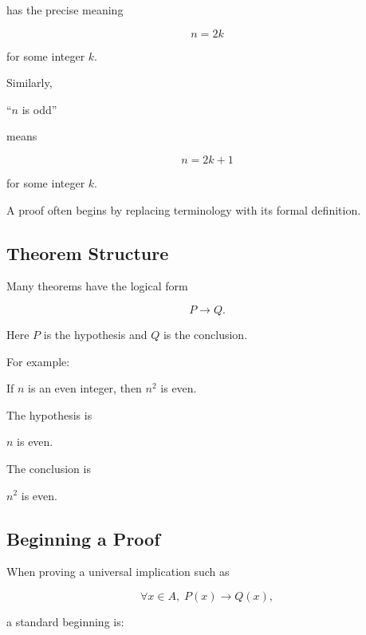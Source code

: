has the precise meaning

\[ n=2k \]

for some integer \(k\).

Similarly,

\begin{center}
``\(n\) is odd''
\end{center}

means

\[ n=2k+1 \]

for some integer \(k\).

A proof often begins by replacing terminology with its formal definition.

\subsection{Theorem Structure}
\label{subsec:theorem-structure}

Many theorems have the logical form

\[ P\to Q. \]

Here \(P\) is the hypothesis and \(Q\) is the conclusion.

For example:

\begin{theorem}
If \(n\) is an even integer, then \(n^2\) is even.
\end{theorem}

The hypothesis is

\begin{center}
\(n\) is even.
\end{center}

The conclusion is

\begin{center}
\(n^2\) is even.
\end{center}

\subsection{Beginning a Proof}
\label{subsec:beginning-proof}

When proving a universal implication such as

\[ \forall x\in A,\;P(x)\to Q(x), \]

a standard beginning is:

